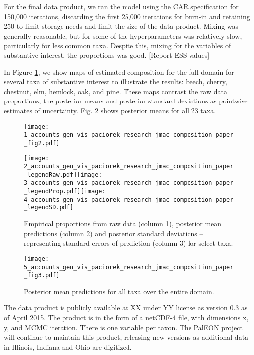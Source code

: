 \documentclass[12pt]{article}\usepackage[]{graphicx}\usepackage[]{color}
\begin{document}
For the final data product, we ran the model using the CAR specification
for 150,000 iterations, discarding the first 25,000 iterations for
burn-in and retaining 250 to limit storage needs and limit the size
of the data product. Mixing was generally reasonable, but for some
of the hyperparameters was relatively slow, particularly for less
common taxa. Despite this, mixing for the variables of substantive
interest, the proportions was good. {[}Report ESS values{]}

In Figure \ref{fig:select_maps}, we show maps of estimated composition
for the full domain for several taxa of substantive interest to illustrate
the results: beech, cherry, chestnut, elm, hemlock, oak, and pine.
These maps contrast the raw data proportions, the posterior means
and posterior standard deviations as pointwise estimates of uncertainty.
Fig. \ref{fig:all_predictions} shows posterior means for all 23 taxa.

\begin{figure}
\label{fig:select_maps}

\texttt{[image: 1\_accounts\_gen\_vis\_paciorek\_research\_jmac\_composition\_paper\_fig2.pdf]}

\hspace{4mm}\texttt{[image: 2\_accounts\_gen\_vis\_paciorek\_research\_jmac\_composition\_paper\_legendRaw.pdf]}\hspace{4mm}\texttt{[image: 3\_accounts\_gen\_vis\_paciorek\_research\_jmac\_composition\_paper\_legendProp.pdf]}\hspace{3.5mm}\texttt{[image: 4\_accounts\_gen\_vis\_paciorek\_research\_jmac\_composition\_paper\_legendSD.pdf]}

\caption{Empirical proportions from raw data (column 1), posterior mean predictions
(column 2) and posterior standard deviations -- representing standard
errors of prediction (column 3) for select taxa.}
\end{figure}


\begin{figure}
\label{fig:all_predictions}

\texttt{[image: 5\_accounts\_gen\_vis\_paciorek\_research\_jmac\_composition\_paper\_fig3.pdf]}

\caption{Posterior mean predictions for all taxa over the entire domain.}


\end{figure}


The data product is publicly available at XX under YY license as version
0.3 as of April 2015. The product is in the form of a netCDF-4 file,
with dimensions x, y, and MCMC iteration. There is one variable per
taxon. The PalEON project will continue to maintain this product,
releasing new versions as additional data in Illinois, Indiana and
Ohio are digitized. 
\end{document}

